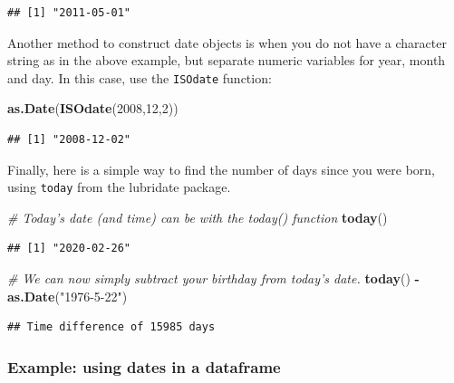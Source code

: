 \documentclass[]{book}
\newenvironment{Shaded}{\begin{snugshade}}{\end{snugshade}}
\newcommand{\CommentTok}[1]{\textcolor[rgb]{0.56,0.35,0.01}{\textit{#1}}}
\newcommand{\DecValTok}[1]{\textcolor[rgb]{0.00,0.00,0.81}{#1}}
\newcommand{\KeywordTok}[1]{\textcolor[rgb]{0.13,0.29,0.53}{\textbf{#1}}}
\newcommand{\NormalTok}[1]{#1}
\newcommand{\OperatorTok}[1]{\textcolor[rgb]{0.81,0.36,0.00}{\textbf{#1}}}
\newcommand{\StringTok}[1]{\textcolor[rgb]{0.31,0.60,0.02}{#1}}
\begin{document}
\begin{verbatim}
## [1] "2011-05-01"
\end{verbatim}

Another method to construct date objects is when you do not have a character string as in the above example, but separate numeric variables for year, month and day. In this case, use the \texttt{ISOdate} function:

\begin{Shaded}
\begin{Highlighting}[]
\KeywordTok{as.Date}\NormalTok{(}\KeywordTok{ISOdate}\NormalTok{(}\DecValTok{2008}\NormalTok{,}\DecValTok{12}\NormalTok{,}\DecValTok{2}\NormalTok{))}
\end{Highlighting}
\end{Shaded}

\begin{verbatim}
## [1] "2008-12-02"
\end{verbatim}

Finally, here is a simple way to find the number of days since you were born, using \texttt{today} from the lubridate package.

\begin{Shaded}
\begin{Highlighting}[]
\CommentTok{# Today's date (and time) can be with the today() function}
\KeywordTok{today}\NormalTok{()}
\end{Highlighting}
\end{Shaded}

\begin{verbatim}
## [1] "2020-02-26"
\end{verbatim}

\begin{Shaded}
\begin{Highlighting}[]
\CommentTok{# We can now simply subtract your birthday from today's date.}
\KeywordTok{today}\NormalTok{() }\OperatorTok{-}\StringTok{ }\KeywordTok{as.Date}\NormalTok{(}\StringTok{"1976-5-22"}\NormalTok{)}
\end{Highlighting}
\end{Shaded}

\begin{verbatim}
## Time difference of 15985 days
\end{verbatim}

\hypertarget{datesdataframe}{%
\subsubsection{Example: using dates in a dataframe}\label{datesdataframe}}
\end{document}
